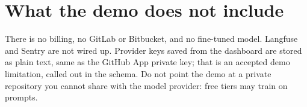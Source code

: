 \section{What the demo does not include}

There is no billing, no GitLab or Bitbucket, and no fine-tuned model. Langfuse and Sentry are not wired up. Provider keys saved from the dashboard are stored as plain text, same as the GitHub App private key; that is an accepted demo limitation, called out in the schema. Do not point the demo at a private repository you cannot share with the model provider: free tiers may train on prompts.
